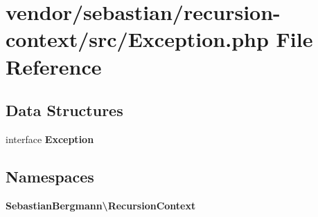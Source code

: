 \section{vendor/sebastian/recursion-\/context/src/\+Exception.php File Reference}
\label{sebastian_2recursion-context_2src_2_exception_8php}
\subsection*{Data Structures}
\begin{DoxyCompactItemize}
\item 
interface {\bf Exception}
\end{DoxyCompactItemize}
\subsection*{Namespaces}
\begin{DoxyCompactItemize}
\item 
 {\bf Sebastian\+Bergmann\textbackslash{}\+Recursion\+Context}
\end{DoxyCompactItemize}
